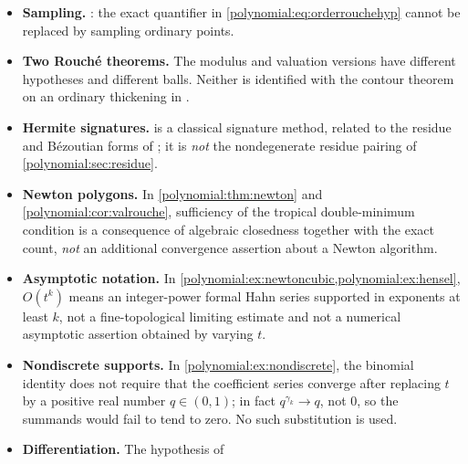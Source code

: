 \documentclass[11pt,letterpaper]{article}
\numberwithin{equation}{section}
\theoremstyle{definition}
\theoremstyle{remark}\newtheorem{remark}[theorem]{Remark}
\begin{document}
\begin{itemize}
theorem \emph{scheme}, one sentence for each fixed finite degree bound. It
does not transfer unrestricted quantification over functions, sequences,
arbitrary subsets, or the standard natural numbers as a distinguished
definable set, and it does not make a proper class into a first-order
set-sized model.  is a transfer theorem, not
a new analytic proof; it does not define an integral along a fine-continuous
real-parameter surreal circle, and it is not the same statement as the
leading-coefficient Rouch\'e theorem on ordinary thickened domains in
\cite{polynomial:SourceAnalysis}, whose hypothesis is different. No
real-parameter fine-continuous circle or contour integral has been introduced
anywhere in this article.
\item \textbf{Sampling.} : the exact
quantifier in \eqref{polynomial:eq:orderrouchehyp} cannot be replaced by
sampling ordinary points.
\item \textbf{Two Rouch\'e theorems.} The modulus and valuation versions have
different hypotheses and different balls. Neither is identified with the
contour theorem on an ordinary thickening in
\cite{polynomial:SourceAnalysis}.
\item \textbf{Hermite signatures.}  is a
classical signature method, related to the residue and B\'ezoutian forms of
\cite{polynomial:BCRS}; it is \emph{not} the nondegenerate residue pairing of
\cref{polynomial:sec:residue}.
\item \textbf{Newton polygons.} In
\cref{polynomial:thm:newton} and \cref{polynomial:cor:valrouche}, sufficiency
of the tropical double-minimum condition is a consequence of algebraic
closedness together with the exact count, \emph{not} an additional convergence
assertion about a Newton algorithm.
\item \textbf{Asymptotic notation.} In
\cref{polynomial:ex:newtoncubic,polynomial:ex:hensel}, $O(t^k)$ means an
integer-power formal Hahn series supported in exponents at least $k$, not a
fine-topological limiting estimate and not a numerical asymptotic assertion
obtained by varying $t$.
\item \textbf{Nondiscrete supports.} In
\cref{polynomial:ex:nondiscrete}, the binomial identity does not require that
the coefficient series converge after replacing $t$ by a positive real number
$q\in(0,1)$; in fact $q^{\gamma_k}\to q$, not $0$, so the summands would fail
to tend to zero. No such substitution is used.
\item \textbf{Differentiation.} The hypothesis of

\end{itemize}
\end{document}
